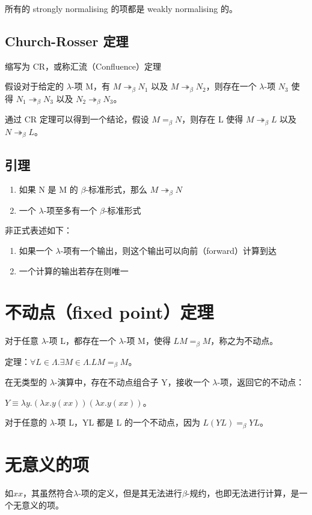 \documentclass[UTF8]{article}
\begin{document}
	所有的 strongly normalising 的项都是 weakly normalising 的。

\subsection{Church-Rosser 定理}

	缩写为 CR，或称汇流（Confluence）定理

	假设对于给定的 $\lambda$-项 M，有 $M \twoheadrightarrow_\beta N_1$ 以及 $M \twoheadrightarrow_\beta N_2$，则存在一个 $\lambda$-项 $N_3$ 使得 $N_1 \twoheadrightarrow_\beta N_3$ 以及 $N_2 \twoheadrightarrow_\beta N_3$。

	通过 CR 定理可以得到一个结论，假设 $M =_\beta N$，则存在 L 使得 $M \twoheadrightarrow_\beta L$ 以及 $N \twoheadrightarrow_\beta L$。

\subsection{引理}

	\begin{enumerate}
		\item 如果 N 是 M 的 $\beta$-标准形式，那么 $M \twoheadrightarrow_\beta N$
		\item 一个 $\lambda$-项至多有一个 $\beta$-标准形式
	\end{enumerate}

	非正式表述如下：
	\begin{enumerate}
		\item 如果一个 $\lambda$-项有一个输出，则这个输出可以向前（forward）计算到达
		\item 一个计算的输出若存在则唯一
	\end{enumerate}

\section{不动点（fixed point）定理}

	对于任意 $\lambda$-项 L，都存在一个 $\lambda$-项 M，使得 $LM =_\beta M$，称之为不动点。

	定理：$\forall L \in \Lambda. \exists M \in \Lambda. LM =_\beta M$。

	在无类型的 $\lambda$-演算中，存在不动点组合子 Y，接收一个 $\lambda$-项，返回它的不动点：

	$Y\equiv \lambda y.(\lambda x.y(xx))(\lambda x.y(xx))$。

	对于任意的 $\lambda$-项 L，YL 都是 L 的一个不动点，因为 $L(YL) =_\beta YL$。

\section{无意义的项}

	如$xx$，其虽然符合$\lambda$-项的定义，但是其无法进行$\beta$-规约，也即无法进行计算，是一个无意义的项。
\end{document}
